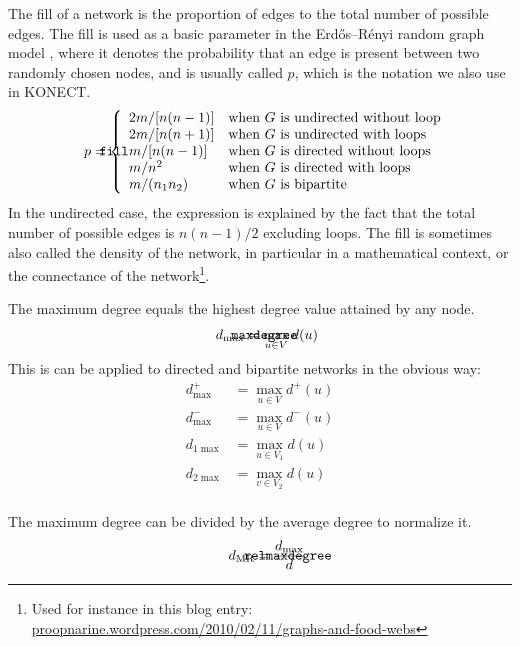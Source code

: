 \documentclass{article}
\def\mathnote#1{%
  \tag*{\rlap{\hspace\marginparsep\smash{\parbox[t]{\marginparwidth}{#1}}}}
}
\begin{document}
The fill of a network is the proportion of edges to the total
number of possible edges. 
The fill is used as a basic parameter in the Erdős--Rényi random graph
model \citep{b569}, where it denotes the probability that an edge is present between
two randomly chosen nodes, and is usually called $p$, which is the
notation we also use in KONECT. 
\begin{align}
  \mathnote{\texttt{fill}}
  p &= \left\{ \begin{array}{ll}
    2m / [n(n-1)] & \text{when $G$ is undirected without loop} \\
    2m / [n(n+1)] & \text{when $G$ is undirected with loops} \\
    m / [n(n-1)] & \text{when $G$ is directed without loops} \\
    m / n^2 & \text{when $G$ is directed with loops} \\
    m / (n_1 n_2) & \text{when $G$ is bipartite} 
  \end{array}\right. 
\end{align}
In the undirected case, the expression is explained by the fact that the
total number of possible edges is $n(n-1)/2$ excluding loops.  
The fill is sometimes also called the density of the network, in
particular in a mathematical context, or the connectance of the
network\footnote{Used for instance in this blog entry:  \href{https://proopnarine.wordpress.com/2010/02/11/graphs-and-food-webs/}{proopnarine.wordpress.com/2010/02/11/graphs-and-food-webs}}. 

The maximum degree equals the highest degree value attained
by any node.
\begin{align}
  \mathnote{\texttt{maxdegree}}
  d_{\max} &= \max_{u\in V} d(u)
\end{align}
This is can be applied to directed and bipartite networks in the obvious way:
\begin{align*}
  d^+_{\max} &= \max_{u \in V} d^+(u) \\
  d^-_{\max} &= \max_{u \in V} d^-(u) \\
  d_{1 \max} &= \max_{u \in V_1} d(u) \\
  d_{2 \max} &= \max_{v \in V_2} d(u) \\
\end{align*}

The maximum degree can be divided by the average degree to normalize it.
\begin{align}
  \mathnote{\texttt{relmaxdegree}}
  d_{\mathrm{MR}} &= \frac {d_{\max}} {d}
\end{align}
\end{document}

